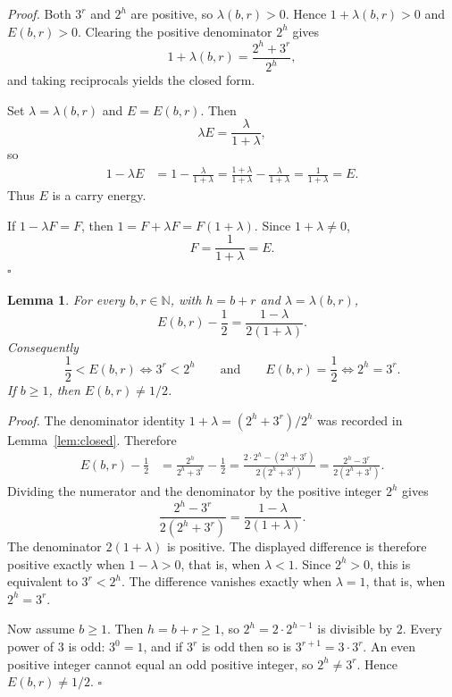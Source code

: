 \documentclass[11pt,letterpaper]{article}
\newcommand{\N}{\mathbb{N}}
\newtheorem{lemma}[theorem]{Lemma}
\newenvironment{proof}{\noindent\textit{Proof.}}{\hfill\(\square\)}
\begin{document}
\begin{proof}
Both \(3^{r}\) and \(2^{h}\) are positive, so \(\lambda(b,r)>0\). Hence \(1+\lambda(b,r)>0\) and \(E(b,r)>0\). Clearing the positive denominator \(2^{h}\) gives
\[
1+\lambda(b,r)=\frac{2^{h}+3^{r}}{2^{h}},
\]
and taking reciprocals yields the closed form.

Set \(\lambda=\lambda(b,r)\) and \(E=E(b,r)\). Then
\[
\lambda E=\frac{\lambda}{1+\lambda},
\]
so
\begin{align*}
1-\lambda E
&=1-\frac{\lambda}{1+\lambda}
=\frac{1+\lambda}{1+\lambda}-\frac{\lambda}{1+\lambda}
=\frac{1}{1+\lambda}
=E.
\end{align*}
Thus \(E\) is a carry energy.

If \(1-\lambda F=F\), then \(1=F+\lambda F=F(1+\lambda)\). Since \(1+\lambda\neq 0\),
\[
F=\frac{1}{1+\lambda}=E.
\]
\end{proof}

\begin{lemma}
\label{lem:half}
For every \(b,r\in\N\), with \(h=b+r\) and \(\lambda=\lambda(b,r)\),
\[
E(b,r)-\frac{1}{2}=\frac{1-\lambda}{2(1+\lambda)}.
\]
Consequently
\[
\frac{1}{2}<E(b,r)\iff 3^{r}<2^{h}
\qquad\text{and}\qquad
E(b,r)=\frac{1}{2}\iff 2^{h}=3^{r}.
\]
If \(b\geq 1\), then \(E(b,r)\neq 1/2\).
\end{lemma}

\begin{proof}
The denominator identity \(1+\lambda=(2^{h}+3^{r})/2^{h}\) was recorded in Lemma~\ref{lem:closed}. Therefore
\begin{align*}
E(b,r)-\frac{1}{2}
&=\frac{2^{h}}{2^{h}+3^{r}}-\frac{1}{2}
=\frac{2\cdot 2^{h}-(2^{h}+3^{r})}{2(2^{h}+3^{r})}
=\frac{2^{h}-3^{r}}{2(2^{h}+3^{r})}.
\end{align*}
Dividing the numerator and the denominator by the positive integer \(2^{h}\) gives
\[
\frac{2^{h}-3^{r}}{2(2^{h}+3^{r})}
=\frac{1-\lambda}{2(1+\lambda)}.
\]
The denominator \(2(1+\lambda)\) is positive. The displayed difference is therefore positive exactly when \(1-\lambda>0\), that is, when \(\lambda<1\). Since \(2^{h}>0\), this is equivalent to \(3^{r}<2^{h}\). The difference vanishes exactly when \(\lambda=1\), that is, when \(2^{h}=3^{r}\).

Now assume \(b\geq 1\). Then \(h=b+r\geq 1\), so \(2^{h}=2\cdot 2^{h-1}\) is divisible by \(2\). Every power of \(3\) is odd: \(3^{0}=1\), and if \(3^{r}\) is odd then so is \(3^{r+1}=3\cdot 3^{r}\). An even positive integer cannot equal an odd positive integer, so \(2^{h}\neq 3^{r}\). Hence \(E(b,r)\neq 1/2\).
\end{proof}
\end{document}
